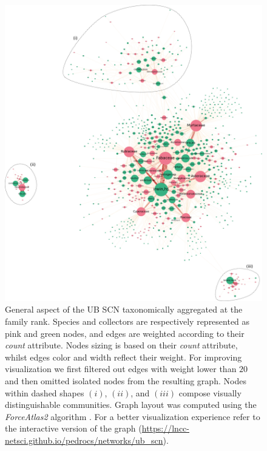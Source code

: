 \begin{figure}[!ht]
\centering
\includegraphics[width=\linewidth]{figures/casestudy_ub/scn_agg_family_general.pdf}
\caption[General aspect of the UB SCN taxonomically aggregated at the family rank.]{ General aspect of the UB SCN taxonomically aggregated at the family rank. Species and collectors are respectively represented as pink and green nodes, and edges are weighted according to their \textit{count} attribute. Nodes sizing is based on their \textit{count} attribute, whilst edges color and width reflect their weight. For improving visualization we first filtered out edges with weight lower than $20$ and then omitted isolated nodes from the resulting graph. Nodes within dashed shapes $(i)$, $(ii)$, and $(iii)$ compose visually distinguishable communities. Graph layout was computed using the \textit{ForceAtlas2} algorithm \cite{Jacomy2014}. For a better visualization experience refer to the interactive version of the graph (\url{https://lncc-netsci.github.io/pedrocs/networks/ub_scn}). }
\label{fig:ub_scn_agg_family_general}
\end{figure}

